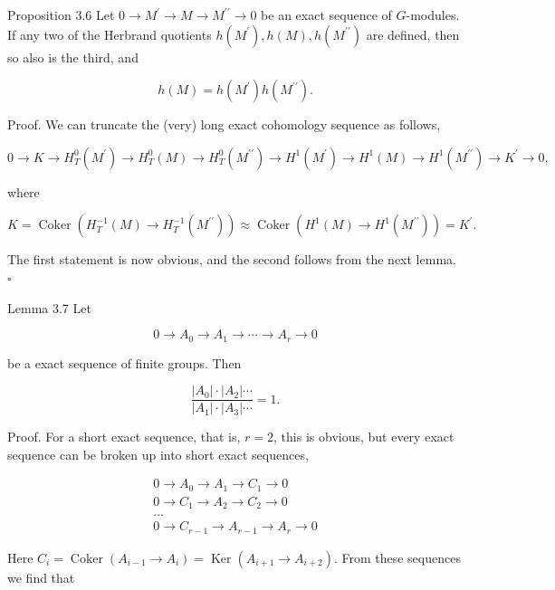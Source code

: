 \documentclass[10pt]{article}
\begin{document}
Proposition 3.6 Let $0 \rightarrow M^{\prime} \rightarrow M \rightarrow M^{\prime \prime} \rightarrow 0$ be an exact sequence of $G$-modules. If any two of the Herbrand quotients $h\left(M^{\prime}\right), h(M), h\left(M^{\prime \prime}\right)$ are defined, then so also is the third, and

$$
h(M)=h\left(M^{\prime}\right) h\left(M^{\prime \prime}\right) .
$$

Proof. We can truncate the (very) long exact cohomology sequence as follows,

$$
0 \rightarrow K \rightarrow H_{T}^{0}\left(M^{\prime}\right) \rightarrow H_{T}^{0}(M) \rightarrow H_{T}^{0}\left(M^{\prime \prime}\right) \rightarrow H^{1}\left(M^{\prime}\right) \rightarrow H^{1}(M) \rightarrow H^{1}\left(M^{\prime \prime}\right) \rightarrow K^{\prime} \rightarrow 0,
$$

where

$$
K=\operatorname{Coker}\left(H_{T}^{-1}(M) \rightarrow H_{T}^{-1}\left(M^{\prime \prime}\right)\right) \approx \operatorname{Coker}\left(H^{1}(M) \rightarrow H^{1}\left(M^{\prime \prime}\right)\right)=K^{\prime} .
$$

The first statement is now obvious, and the second follows from the next lemma. \(\square\)

Lemma 3.7 Let

$$
0 \rightarrow A_{0} \rightarrow A_{1} \rightarrow \cdots \rightarrow A_{r} \rightarrow 0
$$

be a exact sequence of finite groups. Then

$$
\frac{\left|A_{0}\right| \cdot\left|A_{2}\right| \cdots}{\left|A_{1}\right| \cdot\left|A_{3}\right| \cdots}=1 .
$$

Proof. For a short exact sequence, that is, $r=2$, this is obvious, but every exact sequence can be broken up into short exact sequences,

$$
\begin{gathered}
0 \rightarrow A_{0} \rightarrow A_{1} \rightarrow C_{1} \rightarrow 0 \\
0 \rightarrow C_{1} \rightarrow A_{2} \rightarrow C_{2} \rightarrow 0 \\
\ldots \\
0 \rightarrow C_{r-1} \rightarrow A_{r-1} \rightarrow A_{r} \rightarrow 0
\end{gathered}
$$

Here $C_{i}=\operatorname{Coker}\left(A_{i-1} \rightarrow A_{i}\right)=\operatorname{Ker}\left(A_{i+1} \rightarrow A_{i+2}\right)$. From these sequences we find that
\end{document}
